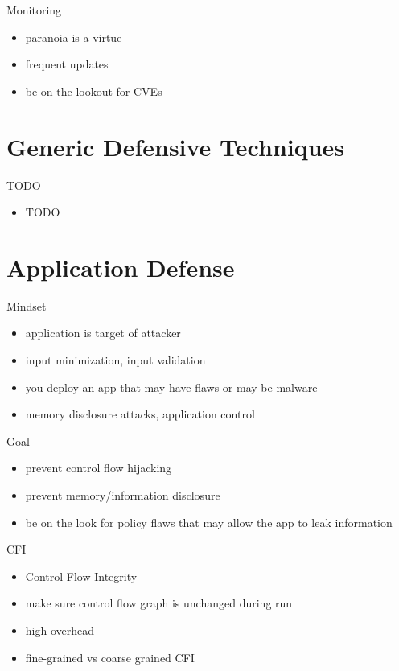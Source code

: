 \documentclass{curs}
\begin{document}
\begin{frame}{Monitoring}
  \begin{itemize}
    \item paranoia is a virtue
    \item frequent updates
    \item be on the lookout for CVEs
  \end{itemize}
\end{frame}


\section{Generic Defensive Techniques}

\begin{frame}{TODO}
  \begin{itemize}
    \item TODO
  \end{itemize}
\end{frame}


\section{Application Defense}

\begin{frame}{Mindset}
  \begin{itemize}
    \item application is target of attacker
    \item input minimization, input validation
    \item you deploy an app that may have flaws or may be malware
    \item memory disclosure attacks, application control
  \end{itemize}
\end{frame}

\begin{frame}{Goal}
  \begin{itemize}
    \item prevent control flow hijacking
    \item prevent memory/information disclosure
    \item be on the look for policy flaws that may allow the app to leak information
  \end{itemize}
\end{frame}

\begin{frame}{CFI}
  \begin{itemize}
    \item Control Flow Integrity
    \item make sure control flow graph is unchanged during run
    \item high overhead
    \item fine-grained vs coarse grained CFI
  \end{itemize}
\end{frame}
\end{document}
